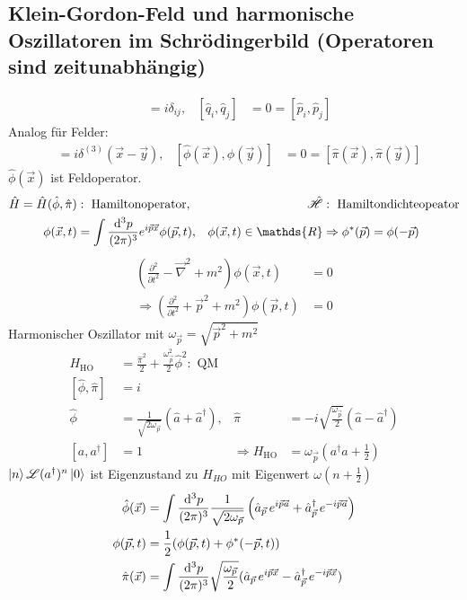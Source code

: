 \subsection{Klein-Gordon-Feld und harmonische Oszillatoren im Schrödingerbild (Operatoren sind zeitunabhängig)}
	\begin{align*}
		[\hat{q}_i, \hat{p}_j] &= i \delta_{ij},&
		[\hat{q}_i, \hat{q}_j] &= 0 = [\hat{p}_i, \hat{p}_j]
	\end{align*}
Analog für Felder:
	\begin{align*}
		[\hat{\phi}(\vec{x}), \hat{\pi}(\vec{y})] &= 
		i \delta^{(3)}(\vec{x}- \vec{y}),&
		[\hat{\phi}(\vec{x}), \hat{\phi}(\vec{y})] &= 0 = 
		[\hat{\pi}(\vec{x}), \hat{\pi}(\vec{y})]
	\end{align*}
$\hat{\phi}(\vec{x})$ ist Feldoperator.
	\begin{align*}
		\hat{H} = \hat{H} (\hat{\phi}, \hat{\pi})&: 
		\text{ Hamiltonoperator},&
		\hat{\Ha}&: \text{ Hamiltondichteopeator} \\
		\phi(\vec{x},t) &= \int \frac{\diff^3 p}{(2 \pi)^3} e^{i\vec{p}\vec{x}} \phi(\vec{p},t),& 
		\phi(\vec{x},t) \in \mathds{R}&\Rightarrow \phi^* (\vec{p}) = \phi (-\vec{p}) 
	\end{align*}
	\begin{align*}
		\left(
			\frac{\partial^2}{\partial t^2} - \vec{\nabla}^2 + m^2
		\right) \phi(\vec{x}, t) &= 0 \\
		\Rightarrow \left(
			\frac{\partial^2}{\partial t^2} + \vec{p}^2 + m^2
		\right) \phi(\vec{p}, t) &= 0
	\end{align*}
Harmonischer Oszillator mit $\omega_{\vec{p}} = \sqrt{\vec{p}^2 + m^2}$
	\begin{align*}
		H_{\text{HO}} &= \frac{\hat{\pi}^2}{2} + \frac{\omega_{\vec{p}}^2}{2} \hat{\phi}^2 : \text{ QM} \\
		[\hat{\phi}, \hat{\pi}] &= i \\
		\hat{\phi} &= \frac{1}{\sqrt{2 \omega_{\vec{p}}}} (\hat{a} + \hat{a}^\dagger),&
		\hat{\pi} &= - i \sqrt{\frac{\omega_{\vec{p}}}{2}}( \hat{a} - \hat{a}^\dagger) \\
		[a, a^\dagger] &= 1 & \Rightarrow
		H_{\text{HO}} &= \omega_{\vec{p}}(a^\dagger a + \frac{1}{2})
	\end{align*}
$\ket{n} \mathscr{L} (a^\dagger)^n \ket{0}$ ist Eigenzustand zu $H_{HO}$ mit Eigenwert $\omega (n + \frac{1}{2})$ 
	\begin{align*}
		\hat{\phi} (\vec{x}) &= 
		\int \frac{\mathrm{d}^3 p}{(2 \pi)^3} \frac{1}{\sqrt{2 \omega_{\vec{p}}}}
		\left(	
			\hat{a}_{\vec{p}} \,e^{i\vec{p}\vec{a}} + \hat{a}^\dagger_{\vec{p}}\, e^{-i\vec{p}\vec{a}}
		\right) \\
		\phi (\vec{p},t) &= \frac{1}{2} (\phi(\vec{p},t) + \phi^*(-\vec{p},t)) \\
		\hat{\pi}(\vec{x}) &= \int \frac{\mathrm{d}^3 p}{(2\pi)^3}
		\sqrt{\frac{\omega_{\vec{p}}}{2}} (\hat{a}_{\vec{p}} \,e^{i \vec{p} \vec{x}} -
		\hat{a}^\dagger_{\vec{p}} \,e^{- i \vec{p} \vec{x}}) 
	\end{align*}
